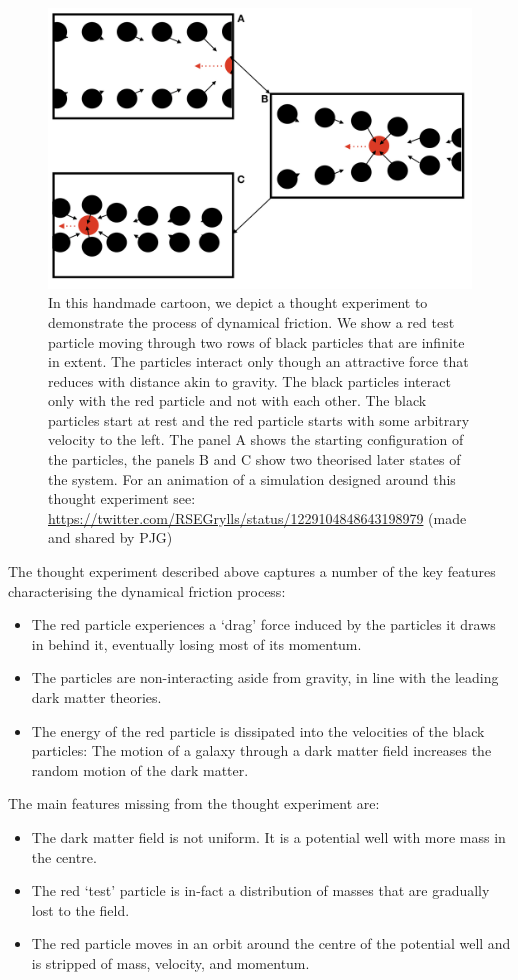 \begin{figure}[h!]
    \centering
    \includegraphics[width = \linewidth]{Figures/Chapter2/Dynamical_Friction.png}
    \caption{In this handmade cartoon, we depict a thought experiment to demonstrate the process of dynamical friction. We show a red test particle moving through two rows of black particles that are infinite in extent. The particles interact only though an attractive force that reduces with distance akin to gravity. The black particles interact only with the red particle and not with each other. The black particles start at rest and the red particle starts with some arbitrary velocity to the left. The panel A shows the starting configuration of the particles, the panels B and C show two theorised later states of the system. For an animation of a simulation designed around this thought experiment see: \url{https://twitter.com/RSEGrylls/status/1229104848643198979} (made and shared by PJG)}
    \label{fig:Tdyn_toon}
\end{figure}

The thought experiment described above captures a number of the key features characterising the dynamical friction process: 
\begin{itemize}
    \item The red particle experiences a `drag' force induced by the particles it draws in behind it, eventually losing most of its momentum.
    \item The particles are non-interacting aside from gravity, in line with the leading dark matter theories.
    \item The energy of the red particle is dissipated into the velocities of the black particles: The motion of a galaxy through a dark matter field increases the random motion of the dark matter.
\end{itemize}
The main features missing from the thought experiment are:
\begin{itemize}
    \item The dark matter field is not uniform. It is a 
    potential well with more mass in the centre.
    \item The red `test' particle is in-fact a distribution of masses that are gradually lost to the field.
    \item The red particle moves in an orbit around the centre of the potential well and is stripped of mass, velocity, and momentum.
\end{itemize}

